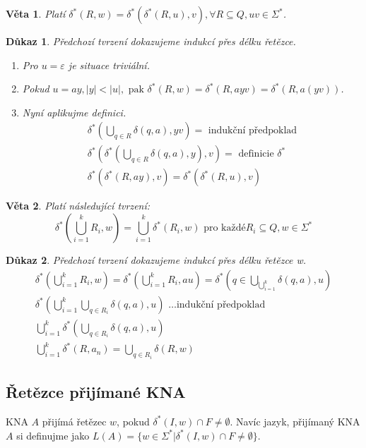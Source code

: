 \documentclass[10pt, a4paper, titlepage]{article}
\theoremstyle{note}
\newtheorem{veta}{Věta}
\newtheorem{dukaz}{Důkaz}
\begin{document}
\begin{veta}
Platí $\delta^{*}(R,w) = \delta^{*}(\delta^{*}(R,u),v), \forall R \subseteq Q, uv \in \Sigma^{*}$.
\end{veta}
\begin{dukaz}
Předchozí tvrzení dokazujeme indukcí přes délku řetězce.

\begin{enumerate}
\item
Pro $u = \varepsilon$ je situace triviální.

\item
Pokud $u = ay, |y| < |u|,\text{ pak } \delta^{*}(R,w) = \delta^{*}(R,ayv) = \delta^{*}(R,a(yv))$.

\item
Nyní aplikujme definici.
\begin{gather*}
\delta^{*}(\bigcup\limits_{q \in R} \delta(q, a), yv) = \text{ indukční předpoklad} \\
\delta^{*}(\delta^{*}(\bigcup\limits_{q \in R} \delta(q, a), y), v) = \text{ definicie } \delta^{*} \\
\delta^{*}(\delta^{*}(R, ay), v) = \delta^{*}(\delta^{*}(R,u),v)
\end{gather*}
\end{enumerate}
\end{dukaz}

\begin{veta}
Platí následující tvrzení:
$$
\delta^{*}(\bigcup\limits_{i=1}^{k} R_{i},w) = \bigcup\limits_{i=1}^{k} \delta^{*}(R_{i},w) \text{ pro každé} R_{i} \subseteq Q, w \in \Sigma^{*}
$$
\end{veta}
\begin{dukaz}
Předchozí tvrzení dokazujeme indukcí přes délku řetězce w.
\begin{gather*}
\delta^{*}(\bigcup\limits_{i=1}^{k}R_{i},w) = \delta^{*}(\bigcup\limits_{i=1}^{k}R_{i},au) = \delta^{*}(q \in \bigcup\limits_{\bigcup_{i=1}^{k}} \delta(q, a), u) \\
\delta^{*}(\bigcup\limits_{i=1}^{k}\bigcup\limits_{q \in R_{i}} \delta(q,a),u) \text{ \ldots indukční předpoklad} \\
\bigcup\limits_{i=1}^{k} \delta^{*}(\bigcup\limits_{q \in R_{i}} \delta(q,a),u) \\
\bigcup\limits_{i=1}^{k} \delta^{*}(R,a_{n}) = \bigcup\limits_{q \in R_{i}} \delta(R,w)
\end{gather*}
\end{dukaz}

\subsection{Řetězce přijímané KNA}
KNA $A$ přijímá řetězec $w$, pokud $\delta^{*}(I,w) \cap F \neq \emptyset$.
Navíc jazyk, přijímaný KNA $A$ si definujme jako $L(A) = \lbrace w \in \Sigma^{*} | \delta^{*}(I,w) \cap F \neq \emptyset \rbrace$.
\end{document}
